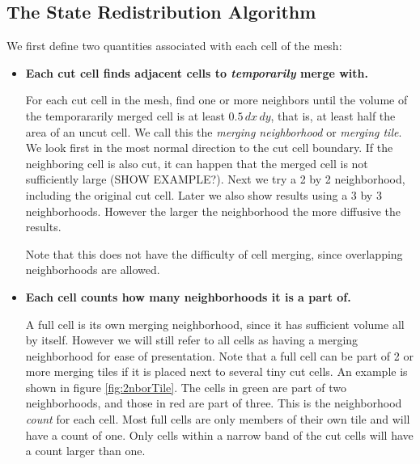 \subsection{The State Redistribution Algorithm}

We first define two quantities associated with each cell of the mesh:

\begin{itemize}
\item
{\bf Each cut cell finds adjacent cells to {\em temporarily} merge with.}

\vspace*{.1in}
For each cut cell in the mesh, find  one or more neighbors until the
volume of the temporararily merged cell is at least $0.5 \, dx \,  dy $,
that is, at least half the area of an uncut cell. We call this the 
{\em  merging neighborhood} or {\em merging tile}.  We look first in the
most normal direction to the cut cell boundary. If the neighboring cell 
is also cut, it can happen that the
merged cell is not sufficiently large (SHOW EXAMPLE?). 
Next we try a 2 by 2
neighborhood, including the original cut cell. Later we also show
results using a 3 by 3 neighborhoods. However the larger the
neighborhood the more diffusive the results.

Note that this does not have the difficulty of cell merging, since 
overlapping neighborhoods are allowed. 

\item
{\bf Each cell counts how many neighborhoods it is a part of.}

\vspace*{.1in}
A full cell is its own merging neighborhood, since it has sufficient
volume all by itself. However we will still refer to all cells as having a
merging neighborhood for ease of presentation.  Note that a full cell
can be part of 2 or more merging tiles if it is placed next to 
several tiny cut cells. An example is shown in
figure \ref{fig:2nborTile}. The cells in green are part of two
neighborhoods, and those in red are part of three.   
This is the neighborhood {\em count} for each cell. Most full
cells are only members of their own tile and will have a count of one.
Only cells within a narrow band of the cut cells will have a count
larger than one.

\end{itemize}

